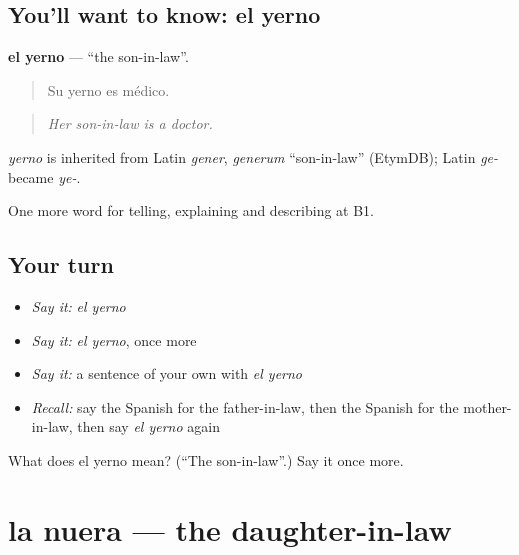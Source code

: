 \subsection*{You'll want to know: el yerno}
\textbf{el yerno} — \textquotedblleft{}the son-in-law\textquotedblright{}.

\begin{quote}
Su yerno es médico.
\end{quote}

\begin{quote}
\emph{Her son-in-law is a doctor.}
\end{quote}

\begin{cousinweb}
\emph{yerno} is inherited from Latin \emph{gener}, \emph{generum} \textquotedblleft{}son-in-law\textquotedblright{} (EtymDB); Latin \emph{ge-} became \emph{ye-}.
\end{cousinweb}

\begin{grammarlens}[title={What you've built}]
One more word for telling, explaining and describing at B1.
\end{grammarlens}

\subsection*{Your turn}
\begin{itemize}
\raggedright
  \item \emph{Say it:} \emph{el yerno}
  \item \emph{Say it:} \emph{el yerno}, once more
  \item \emph{Say it:} a sentence of your own with \emph{el yerno}
  \item \emph{Recall:} say the Spanish for the father-in-law, then the Spanish for the mother-in-law, then say \emph{el yerno} again
\end{itemize}

\begin{tcolorbox}[breakable,colback=teal!4,colframe=teal!35!black,title={Before you move on}]
What does el yerno mean? (\textquotedblleft{}The son-in-law\textquotedblright{}.) Say it once more.
\end{tcolorbox}
\section[la nuera]{la nuera — the daughter-in-law}

\label{lesson:ES-C747-nuera}



